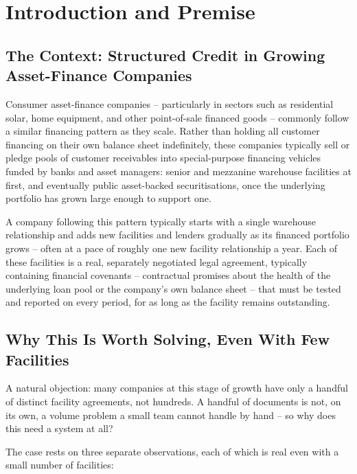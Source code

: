\documentclass[11pt,a4paper]{article}
\begin{document}
\section{Introduction and Premise}

\subsection{The Context: Structured Credit in Growing Asset-Finance Companies}

Consumer asset-finance companies -- particularly in sectors such as residential solar, home equipment, and other point-of-sale financed goods -- commonly follow a similar financing pattern as they scale. Rather than holding all customer financing on their own balance sheet indefinitely, these companies typically sell or pledge pools of customer receivables into special-purpose financing vehicles funded by banks and asset managers: senior and mezzanine warehouse facilities at first, and eventually public asset-backed securitisations, once the underlying portfolio has grown large enough to support one.

A company following this pattern typically starts with a single warehouse relationship and adds new facilities and lenders gradually as its financed portfolio grows -- often at a pace of roughly one new facility relationship a year. Each of these facilities is a real, separately negotiated legal agreement, typically containing financial covenants -- contractual promises about the health of the underlying loan pool or the company's own balance sheet -- that must be tested and reported on every period, for as long as the facility remains outstanding.

\subsection{Why This Is Worth Solving, Even With Few Facilities}

A natural objection: many companies at this stage of growth have only a handful of distinct facility agreements, not hundreds. A handful of documents is not, on its own, a volume problem a small team cannot handle by hand -- so why does this need a system at all?

The case rests on three separate observations, each of which is real even with a small number of facilities:
\end{document}
